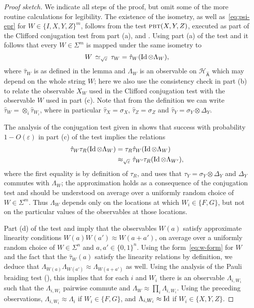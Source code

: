 \documentclass{toc}
\newcommand{\Id}{\ensuremath{\mathop{\rm Id}\nolimits}}
\newcommand{\reg}[1]{{\textsf{#1}}}
\newcommand{\mH}{\mathcal{H}}
\newcommand{\eps}{\varepsilon}
\newcommand{\pbt}{\textsc{pbt}}
\newcommand{\phase}{\Lambda}
\begin{document}
\begin{proof}[Proof sketch]
We indicate all steps of the proof, but omit some of the more routine calculations for legibility. 
The existence of the isometry, as well as~\eqref{eq:psi-epr}  for $W \in \{I,X,Y,Z\}^{m}$, follows from the test $\pbt(X,Y,Z)$, executed as part of the Clifford conjugation test from part (a), and . 
Using part (a) of the test and  it follows that every $W \in \Sigma^m$ is mapped under the same isometry to 
\begin{equation}\label{eq:w-form}
W \,\simeq_{\sqrt{\eps}}\, \tau_W = \hat{\tau}_W(\Id \otimes \phase_W),
\end{equation}
 where $\hat{\tau}_W$ is as defined in the lemma  and  $\phase_W$ is an observable on $\mH_{\hat{\reg{A}}}$ which may depend on the whole string $W$;  here we also use the consistency check in part (b) to relate  the observable $X_W$ used in the Clifford conjugation test with the observable $W$ used in part (c). Note that from the definition we can write $\hat{\tau}_W = \otimes_i \hat{\tau}_{W_i}$, where in particular $\hat{\tau}_X = \sigma_X$, $\hat{\tau}_Z = \sigma_Z$ and $\hat{\tau}_Y = \sigma_Y \otimes \Delta_Y$.

The analysis of the conjugation test given in  shows that success with probability $1-O(\eps)$ in part (c) of the test implies the relations 
\begin{align*}
 \hat{\tau}_W \tau_R(\Id \otimes \phase_W)  &= \tau_R \hat{\tau}_W  (\Id\otimes\phase_W) \\
&  \approx_{\sqrt{\eps}} \hat{\tau}_{W'}  \tau_R (\Id\otimes \phase_{W'}),
\end{align*}
where the first equality is by definition of $\tau_R$, and uses that $\tau_Y = \sigma_Y \otimes \Delta_Y$ and $\Delta_Y$ commutes with $\phase_W$; the approximation holds as a consequence of the conjugation test and should be understood on average over a uniformly random choice of $W\in \Sigma^m$. Thus $\phase_W$ depends only on the locations at which $W_i \in \{F,G\}$, but not on the particular values of the observables at those locations.  

Part (d) of the test and  imply that the observables $W(a)$ satisfy approximate linearity conditions $W(a)W(a')\approx W(a+a')$, on average over a uniformly random choice of $W\in\Sigma^n$ and $a,a'\in\{0,1\}^n$. Using the form~\eqref{eq:w-form} for $W$ and the fact that the $\hat{\tau}_W(a)$ satisfy the linearity relations by definition, we deduce that $\phase_{W(a)}\phase_{{W(a')}} \approx \phase_{W(a+a')}$ as well. Using the analysis of the Pauli braiding test (), this implies that for each $i$ and $W_i$ there is an observable $\phase_{i,W_i}$ such that the $\phase_{i,W_i}$ pairwise commute and $\phase_W \approx \prod_i \phase_{i,W_i}$. Using the preceding observations, $\phase_{i,W_i} \approx \phase_i$ if $W_i \in\{F,G\}$, and $\phase_{i,W_i} \approx \Id$ if $W_i \in \{X,Y,Z\}$. 


\end{proof}
\end{document}
